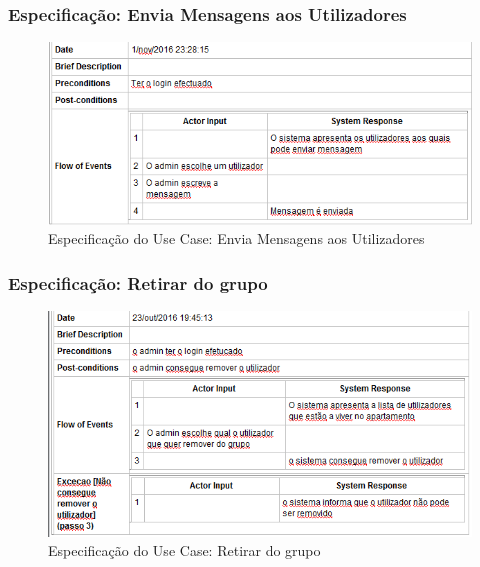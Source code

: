 \newpage

\subsubsection{Especificação: Envia Mensagens aos Utilizadores }

\begin{figure}[htb!]
	\centering
	\includegraphics[scale=0.7]{imagens/Especificacoes/enviasmsutilizadores}  
	\caption{Especificação do Use Case: Envia Mensagens aos Utilizadores}  
\end{figure}



\subsubsection{Especificação: Retirar do grupo }

\begin{figure}[htb!]
	\centering
	\includegraphics[scale=0.7]{imagens/Especificacoes/retirardogrupo}  
	\caption{Especificação do Use Case: Retirar do grupo}  
\end{figure}

